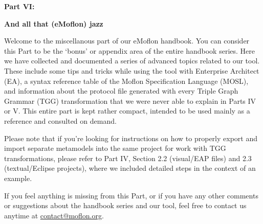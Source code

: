 \vspace*{2cm}

{\bf \huge Part VI:}
\vspace{1cm}

{\Huge \bf And all that (eMoflon) jazz}
\vspace{1cm}

\genHeader

Welcome to the miscellanous part of our eMoflon handbook. You can consider this Part to be the `bonus' or appendix area of the entire handbook series. Here we
have collected and documented a series of advanced topics related to our tool. These include some tips and tricks while using the tool with Enterprise Architect
(EA), a syntax reference table of the Moflon Specification Language (MOSL), and information about the protocol file generated with every Triple Graph Grammar
(TGG) transformation that we were never able to explain in Parts IV or V. This entire part is kept rather compact, intended to be used mainly as a reference and
consulted on demand.

Please note that if you're looking for instructions on how to properly export and import separate metamodels into the same project for work with TGG
transformations, please refer to Part IV, Section 2.2 (visual/EAP files) and 2.3 (textual/Eclipse projects), where we included detailed steps in the context of
an example.

If you feel anything is missing from this Part, or if you have any other comments or suggestions about the handbook series and our tool, feel free to contact us
anytime at \href{mailto:contact@moflon.org}{contact@moflon.org}.
















